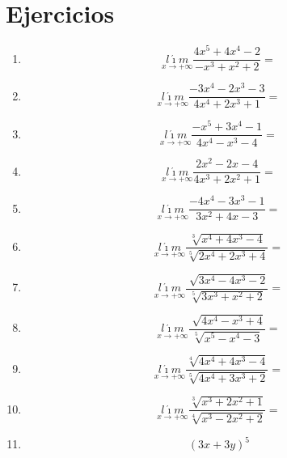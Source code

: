 \documentclass[oneside,spanish,letter]{article}
\begin{document}
\section{Ejercicios}
\begin{enumerate}
 \item $$\underset{x\rightarrow +\infty}{l\acute{\imath}m} \frac{4x^5+4x^4-2}{-x^3+x^2+2}=$$
 \item $$\underset{x\rightarrow +\infty}{l\acute{\imath}m} \frac{-3x^4-2x^3-3}{4x^4+2x^3+1}=$$
 \item $$\underset{x\rightarrow +\infty}{l\acute{\imath}m} \frac{-x^5+3x^4-1}{4x^4-x^3-4}=$$
 \item $$\underset{x\rightarrow +\infty}{l\acute{\imath}m} \frac{2x^2-2x-4}{4x^3+2x^2+1}=$$
 \item $$\underset{x\rightarrow +\infty}{l\acute{\imath}m} \frac{-4x^4-3x^3-1}{3x^2+4x-3}=$$
 \item $$\underset{x\rightarrow +\infty}{l\acute{\imath}m} \frac{\sqrt[3]{x^4+4x^3-4}}{\sqrt[5]{2x^4+2x^3+4}}=$$
 \item $$\underset{x\rightarrow +\infty}{l\acute{\imath}m} \frac{\sqrt[]{3x^4-4x^3-2}}{\sqrt[5]{3x^3+x^2+2}}=$$
 \item $$\underset{x\rightarrow +\infty}{l\acute{\imath}m} \frac{\sqrt[]{4x^4-x^3+4}}{\sqrt[5]{x^5-x^4-3}}=$$
 \item $$\underset{x\rightarrow +\infty}{l\acute{\imath}m} \frac{\sqrt[4]{4x^4+4x^3-4}}{\sqrt[5]{4x^4+3x^3+2}}=$$
 \item $$\underset{x\rightarrow +\infty}{l\acute{\imath}m} \frac{\sqrt[3]{x^3+2x^2+1}}{\sqrt[4]{x^3-2x^2+2}}=$$
\item $$(3x+3y)^5$$
 \end{enumerate}
  \newpage
\end{document}
